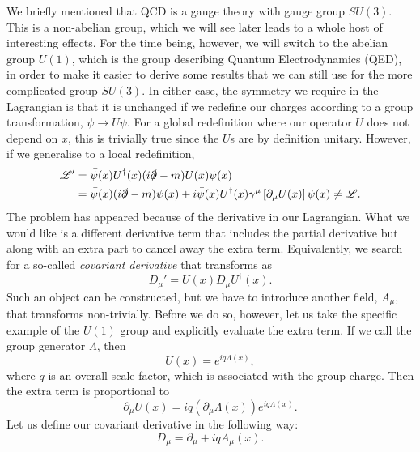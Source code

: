 We briefly mentioned that QCD is a gauge theory with gauge group $SU(3)$. This is a non-abelian group, which we will see later leads to a whole host of interesting effects. For the time being, however, we will switch to the abelian group $U(1)$, which is the group describing Quantum Electrodynamics (QED), in order to make it easier to derive some results that we can still use for the more complicated group $SU(3)$. In either case, the symmetry we require in the Lagrangian is that it is unchanged if we redefine our charges according to a group transformation, $\psi \to U \psi$. For a global redefinition where our operator $U$ does not depend on $x$, this is trivially true since the $U$s are by definition unitary. However, if we generalise to a local redefinition,
\begin{equation}
\begin{split}
\mathscr{L}'& = \bar{\psi}(x)U^\dagger(x)(i \slashed{\partial} - m) U(x)\psi(x)\\
& = \bar{\psi}(x)(i \slashed{\partial} - m)\psi(x) + i \bar{\psi}(x) U^\dagger(x)\gamma^\mu\left[\partial_\mu U(x) \right]\psi(x) \neq \mathscr{L}.
\end{split}
\end{equation}
The problem has appeared because of the derivative in our Lagrangian. What we would like is a different derivative term that includes the partial derivative but along with an extra part to cancel away the extra term. Equivalently, we search for a so-called \emph{covariant derivative} that transforms as
\begin{equation}
D_\mu ' = U(x) D_\mu U^\dagger (x).
\end{equation}
Such an object can be constructed, but we have to introduce another field, $A_\mu$, that transforms non-trivially. Before we do so, however, let us take the specific example of the $U(1)$ group and explicitly evaluate the extra term. If we call the group generator $\Lambda$, then
\begin{equation}
U(x) = e^{i q \Lambda(x)},
\end{equation}
where $q$ is an overall scale factor, which is associated with the group charge. Then the extra term is proportional to
\begin{equation}
\partial_\mu U(x) = i q (\partial_\mu \Lambda(x)) e^{i q \Lambda(x)}.
\end{equation}
Let us define our covariant derivative in the following way:
\begin{equation}
\label{eqn:covder}
D_\mu = \partial_\mu + i q A_\mu(x).
\end{equation}
